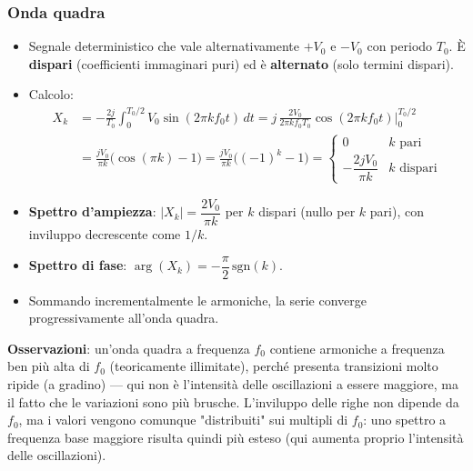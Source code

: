 \documentclass[12pt, a4paper]{article}
\begin{document}
\subsubsection{Onda quadra}
\begin{itemize}
    \item Segnale deterministico che vale alternativamente $+V_0$ e $-V_0$ con periodo $T_0$. È \textbf{dispari} (coefficienti immaginari puri) ed è \textbf{alternato} (solo termini dispari).
    \item Calcolo:
    \begin{align*}
        X_k &= -\frac{2j}{T_0}\int_0^{T_0/2} V_0\sin(2\pi kf_0t)\,dt = j\,\frac{2V_0}{2\pi kf_0T_0}\cos(2\pi kf_0t)\Big|_0^{T_0/2} \\
        &= \frac{jV_0}{\pi k}\big(\cos(\pi k)-1\big) = \frac{jV_0}{\pi k}\big((-1)^k-1\big) = \begin{cases} 0 & k \text{ pari} \\[4pt] -\dfrac{2jV_0}{\pi k} & k \text{ dispari}\end{cases}
    \end{align*}
    \item \textbf{Spettro d'ampiezza}: $|X_k| = \dfrac{2V_0}{\pi k}$ per $k$ dispari (nullo per $k$ pari), con inviluppo decrescente come $1/k$.
    \item \textbf{Spettro di fase}: $\arg(X_k) = -\dfrac{\pi}{2}\,\text{sgn}(k)$.
    \item Sommando incrementalmente le armoniche, la serie converge progressivamente all'onda quadra.
\end{itemize}

\textbf{Osservazioni}: un'onda quadra a frequenza $f_0$ contiene armoniche a frequenza ben più alta di $f_0$ (teoricamente illimitate), perché presenta transizioni molto ripide (a gradino) — qui non è l'intensità delle oscillazioni a essere maggiore, ma il fatto che le variazioni sono più brusche. L'inviluppo delle righe non dipende da $f_0$, ma i valori vengono comunque "distribuiti" sui multipli di $f_0$: uno spettro a frequenza base maggiore risulta quindi più esteso (qui aumenta proprio l'intensità delle oscillazioni).
\end{document}
